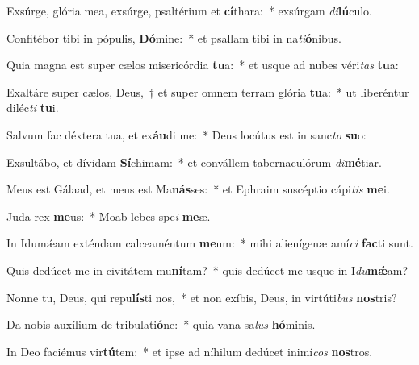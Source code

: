 \item Exsúrge, glória mea, exsúrge, psaltérium et \textbf{cí}thara:~* exsúrgam \textit{di}\textbf{lú}culo.
\item Confitébor tibi in pópulis, \textbf{Dó}mine:~* et psallam tibi in na\textit{ti}\textbf{ó}nibus.
\item Quia magna est super cælos misericórdia \textbf{tu}a:~* et usque ad nubes véri\textit{tas} \textbf{tu}a:
\item Exaltáre super cælos, Deus,~† et super omnem terram glória \textbf{tu}a:~* ut liberéntur diléc\textit{ti} \textbf{tu}i.
\item Salvum fac déxtera tua, et ex\textbf{áu}di me:~* Deus locútus est in sanc\textit{to} \textbf{su}o:
\item Exsultábo, et dívidam \textbf{Sí}chimam:~* et convállem tabernaculórum \textit{di}\textbf{mé}tiar.
\item Meus est Gálaad, et meus est Ma\textbf{nás}ses:~* et Ephraim suscéptio cápi\textit{tis} \textbf{me}i.
\item Juda rex \textbf{me}us:~* Moab lebes spe\textit{i} \textbf{me}æ.
\item In Idumǽam exténdam calceaméntum \textbf{me}um:~* mihi alienígenæ amí\textit{ci} \textbf{fac}ti sunt.
\item Quis dedúcet me in civitátem mu\textbf{ní}tam?~* quis dedúcet me usque in I\textit{du}\textbf{mǽ}am?
\item Nonne tu, Deus, qui repu\textbf{lís}ti nos,~* et non exíbis, Deus, in virtúti\textit{bus} \textbf{nos}tris?
\item Da nobis auxílium de tribulati\textbf{ó}ne:~* quia vana sa\textit{lus} \textbf{hó}minis.
\item In Deo faciémus vir\textbf{tú}tem:~* et ipse ad níhilum dedúcet inimí\textit{cos} \textbf{nos}tros.
